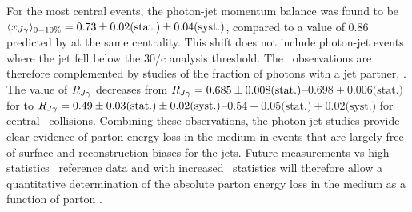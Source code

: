 For the most central events, the  photon-jet momentum balance  was found to be
$\langle x_{J\gamma}\rangle_{0-10\%} = 0.73 \pm 0.02 \mbox{(stat.)} \pm 0.04 \mbox{(syst.)}$, compared
to a value of 0.86 predicted by \PYTHYD{} at the same centrality. This shift does
not include photon-jet events where the jet fell below the 30\GeV/c analysis threshold. 
The \xjg\ observations are therefore complemented by studies of the fraction of 
photons with a jet partner, \rjg.  The value of $R_{J\gamma}$ decreases
from $R_{J\gamma} = 0.685\pm 0.008\mbox{(stat.)}$--$0.698\pm 0.006\mbox{(stat.)}$ for \PYTHYD{}
to  $R_{J\gamma} = 0.49\pm 0.03\mbox{(stat.)}\pm 0.02\mbox{(syst.)}$--$0.54\pm 0.05\mbox{(stat.)}\pm 0.02\mbox{(syst.)}$ for
central \PbPb\ collisions. Combining these observations, the photon-jet studies 
provide clear evidence of parton energy loss in the medium in events that are 
largely free of surface and reconstruction biases for the jets. Future measurements 
vs high statistics \pp\ reference data and with increased \PbPb\ statistics will
therefore allow a quantitative determination of the absolute parton energy loss
in the medium as a function of parton \pt.

